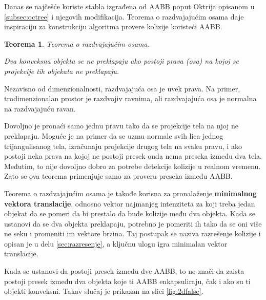\documentclass[12pt,oneside]{memoir}
\newtheorem{teo}{Teorema}[section]
\begin{document}
Danas se najčešće koriste stabla izgrađena od AABB poput Oktrija opisanom u \ref{subsec:octree} i njegovih modifikacija. 
Teorema o razdvajajućim osama daje inspiraciju za konstrukciju algoritma provere kolizije koristeći AABB.

\begin{teo}
	Teorema o razdvajajućim osama. 

	Dva konveksna objekta se ne preklapaju ako postoji prava (osa) na kojoj se projekcije 
	tih objekata ne preklapaju. 
\end{teo}

Nezavisno od dimenzionalnosti, razdvajajuća osa je uvek prava. Na primer, trodimenzionalan prostor
je razdvojiv ravnima, ali razdvajajuća osa je normalna na razdvajajuću ravan.

Dovoljno je pronaći samo jednu pravu tako da se  projekcije tela na njoj ne preklapaju.
Moguće je na primer da se uzmu normale svih lica jednog trijangulisanog tela, izračunaju projekcije drugog 
tela na svaku pravu, i ako postoji neka prava na kojoj ne postoji presek onda nema preseka između
dva tela. Međutim, to nije dovoljno dobro za potrebe detekcije kolizije u realnom vremenu. 
Zato se  ova teorema primenjuje samo za proveru preseka između AABB.

Teorema o razdvajajućim osama je takođe korisna za pronalaženje \textbf{minimalnog vektora translacije}, odnosno
vektor najmanjeg intenziteta za koji treba jedan objekat da se pomeri da bi prestalo da bude kolizije među dva objekta.
Kada se ustanovi da se dva objekta preklapaju, potrebno je pomeriti ih tako da se oni više ne seku i promeniti im vektore brzina.
Taj postupak se naziva razrešenje kolizije i opisan je u delu \ref{sec:razresenje}, a ključnu ulogu igra minimalan vektor translacije.

Kada se ustanovi da postoji presek između dve AABB, to ne znači da zaista postoji presek između dva objekta
koje ti AABB enkapsuliraju, čak i ako su ti objekti konveksni. Takav slučaj je prikazan na slici \ref{fig:2dfalse}. 
\end{document}
